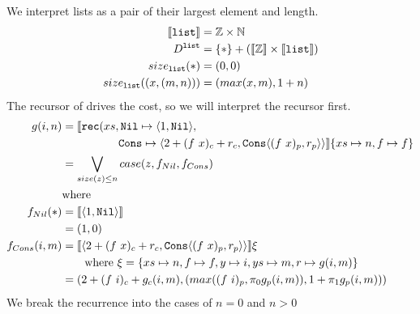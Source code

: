 We interpret lists as a pair of their largest element and length.
%
\begin{align*}
  \llbracket \texttt{list} \rrbracket &= \mathbb{Z} \times \mathbb{N} \\
  D^{\texttt{list}} &= \{*\} + (\llbracket \mathbb{Z} \rrbracket \times \llbracket \texttt{list} \rrbracket) \\
  size_{\texttt{list}}(*) &= (0, 0) \\
  size_{\texttt{list}}((x, (m, n))) &= (max(x, m), 1 + n)
\end{align*}
%
The recursor of  drives the cost, so we will interpret the recursor
first.
%
\begin{align*}
  g(i, n) &= \llbracket \texttt{rec}(xs, \texttt{Nil} \mapsto \langle 1,\texttt{Nil}\rangle, \\
       &\qquad\quad\quad\quad \texttt{Cons} \mapsto \langle 2 + (f\ x)_c + r_c,\texttt{Cons}\langle (f\ x)_p,r_p\rangle\rangle \rrbracket \{xs \mapsto n, f \mapsto f\}\\
       &= \bigvee\limits_{size(z) \leq n} case(z, f_{Nil}, f_{Cons}) \\
       &\text{where} \\
  f_{Nil}(\ast) &= \llbracket \langle 1,\texttt{Nil}\rangle\rrbracket \\
                &= (1,0) \\
  f_{Cons}(i, m) &= \llbracket \langle 2 + (f\ x)_c + r_c,\texttt{Cons}\langle (f\ x)_p,r_p\rangle\rangle\rrbracket \xi\\
                 &\qquad \text{where } \xi = \{xs \mapsto n, f \mapsto f, y \mapsto i, ys \mapsto m, r \mapsto g(i, m) \} \\
                 &= (2 + (f\ i)_c + g_c(i,m), (max((f\ i)_p, \pi_0g_p(i,m)), 1 + \pi_1 g_p(i,m)))
\end{align*}
%
We break the recurrence into the cases of $n=0$ and $n>0$
%
